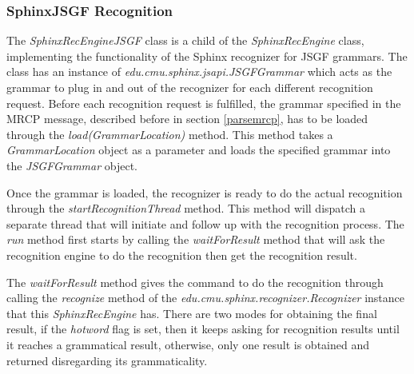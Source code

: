 \subsubsection{SphinxJSGF Recognition}
The \textit{SphinxRecEngineJSGF} class is a child of the \textit{SphinxRecEngine} class, implementing the functionality of the Sphinx recognizer for JSGF grammars.
The class has an instance of \textit{edu.cmu.sphinx.jsapi.JSGFGrammar} which acts as the grammar to plug in and out of the recognizer for each different recognition request.
Before each recognition request is fulfilled, the grammar specified in the MRCP message, described before in section \ref{parsemrcp}, has to be loaded through the \textit{load(GrammarLocation)} method.
This method takes a \textit{GrammarLocation} object as a parameter and loads the specified grammar into the \textit{JSGFGrammar} object.


Once the grammar is loaded, the recognizer is ready to do the actual recognition through the \textit{startRecognitionThread} method.
This method will dispatch a separate thread that will initiate and follow up with the recognition process.
The \textit{run} method first starts by calling the \textit{waitForResult} method that will ask the recognition engine to do the recognition then get the recognition result.


The \textit{waitForResult} method gives the command to do the recognition through calling the \textit{recognize} method of the \textit{edu.cmu.sphinx.recognizer.Recognizer} instance that this \textit{SphinxRecEngine} has.
There are two modes for obtaining the final result, if the \textit{hotword} flag is set, then it keeps asking for recognition results until it reaches a grammatical result, otherwise, only one result is obtained and returned disregarding its grammaticality.


